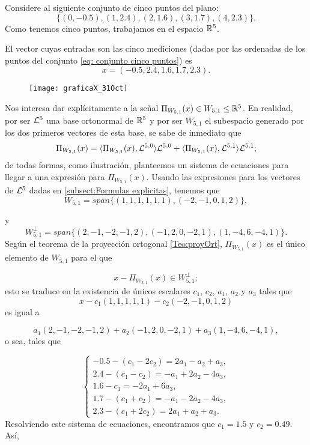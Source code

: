 \begin{ejemplo}
\label{subs: ejm 2}

Considere al siguiente conjunto de cinco
puntos del plano:
\begin{equation} \label{eq: conjunto cinco puntos}
\{ (0,-0.5), (1,2.4), (2, 1.6), (3,1.7), (4, 2.3) \}.
\end{equation}
Como tenemos cinco puntos, trabajamos
en el espacio $\mathbb{R}^{5}$. 

El vector cuyas entradas
son las cinco mediciones (dadas por las ordenadas
de los puntos del conjunto \eqref{eq: conjunto cinco puntos})
es
\begin{equation}
\label{eq0: 29Nov}
x=(-0.5, 2.4, 1.6, 1.7, 2.3).
\end{equation}


\begin{figure}[H]
	\centering
	\texttt{[image: graficaX\_31Oct]} 
\end{figure}	


Nos interesa
dar explícitamente a 
la señal $\Pi_{W_{5,1}}(x) \in W_{5,1} \leq \mathbb{R}^{5}$.
En realidad, por ser $\mathcal{L}^{5}$ 
una base ortonormal de $\mathbb{R}^{5}$ y por ser
$W_{5,1}$ el subespacio generado por los
dos primeros vectores de esta base, 
se sabe de inmediato que
\[
\Pi_{W_{5,1}}(x)=  \langle \Pi_{W_{5,1}}(x), \mathcal{L}^{5,0} \rangle \mathcal{L}^{5,0}
+ \langle \Pi_{W_{5,1}}(x), \mathcal{L}^{5,1} \rangle \mathcal{L}^{5,1};
\]
de todas formas, como ilustración, planteemos un sistema
de ecuaciones para llegar a una expresión para
$\Pi_{W_{5,1}}(x)$.
Usando las expresiones para los vectores
de $\mathcal{L}^{5}$
dadas en \ref{subsect:Formulas explicitas},
tenemos que
\[
W_{5,1}=span\{ (1,1,1,1,1,1), (-2, -1, 0, 1, 2) \},
\]

y 
\[
W_{5,1}^{\perp}=span\{ (2,-1,-2,-1,2), (-1,2,0,-2,1), (1,-4,6,-4,1)\}.
\]
Según el teorema de la proyección ortogonal \ref{Teo:proyOrt},
$\Pi_{W_{5,1}}(x)$ es el único elemento de $W_{5,1}$ para el 
que 

\[
x-\Pi_{W_{5,1}}(x) \in W_{5,1}^{\perp};
\]
esto se 
traduce en la existencia de 
únicos escalares $c_{1}$, $c_{2}$,
$a_{1}$, $a_{2}$ y $a_{3}$ tales que
\[
x-c_{1}(1,1,1,1,1)-c_{2}(-2, -1, 0, 1, 2)
\]
es igual a 

\[
a_{1}(2,-1,-2,-1,2)+a_{2}(-1,2,0,-2,1)
+ a_{3}(1,-4,6,-4,1),
\]
\noindent
o sea, tales que

\begin{equation*}
\begin{cases}
-0.5-(c_{1}-2c_{2})=2a_{1}-a_{2}+a_{3}, \\
2.4-(c_{1}-c_{2})=-a_{1}+2a_{2}-4a_{3}, \\
1.6-c_{1}=-2a_{1}+6a_{3},\\
1.7-(c_{1}+c_{2})=-a_{1}-2a_{2}-4a_{3}, \\
2.3-(c_{1}+2c_{2})=2a_{1}+a_{2}+a_{3}.
\end{cases}
\end{equation*}
Resolviendo este sistema
de ecuaciones, encontramos que
$c_{1}=1.5$ y $c_{2}=0.49$. Así,





\end{ejemplo}
